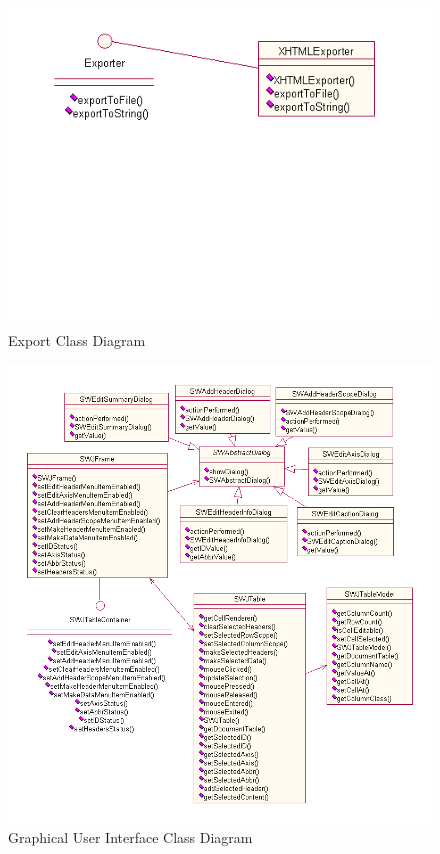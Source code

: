 \begin{figure}
\includegraphics[width=150mm]{figures/export-class-diagram.png}
\caption{Export Class Diagram}
\label{fig:export-class-diagram}
\end{figure}

\begin{figure}
\includegraphics[width=150mm]{figures/gui-class-diagram.png}
\caption{Graphical User Interface Class Diagram}
\label{fig:gui-class-diagram}
\end{figure}

